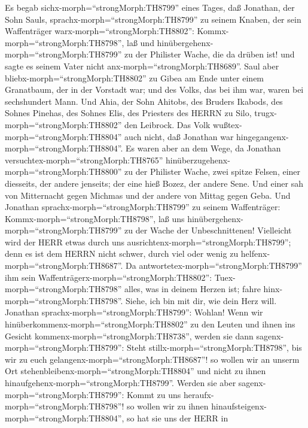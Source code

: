  Es begab sichx-morph=``strongMorph:TH8799'' eines Tages,
daß Jonathan, der Sohn Sauls, sprachx-morph=``strongMorph:TH8799'' zu
seinem Knaben, der sein Waffenträger warx-morph=``strongMorph:TH8802'':
Kommx-morph=``strongMorph:TH8798'', laß und
hinübergehenx-morph=``strongMorph:TH8799'' zu der Philister Wache, die
da drüben ist! und sagte es seinem Vater nicht
anx-morph=``strongMorph:TH8689''.  Saul aber
bliebx-morph=``strongMorph:TH8802'' zu Gibea am Ende unter einem
Granatbaum, der in der Vorstadt war; und des Volks, das bei ihm war,
waren bei sechshundert Mann.  Und Ahia, der Sohn Ahitobs,
des Bruders Ikabods, des Sohnes Pinehas, des Sohnes Elis, des Priesters
des HERRN zu Silo, trugx-morph=``strongMorph:TH8802'' den Leibrock. Das
Volk wußtex-morph=``strongMorph:TH8804'' auch nicht, daß Jonathan war
hingegangenx-morph=``strongMorph:TH8804''.  Es waren aber an
dem Wege, da Jonathan versuchtex-morph=``strongMorph:TH8765''
hinüberzugehenx-morph=``strongMorph:TH8800'' zu der Philister Wache,
zwei spitze Felsen, einer diesseits, der andere jenseits; der eine hieß
Bozez, der andere Sene.  Und einer sah von Mitternacht gegen
Michmas und der andere von Mittag gegen Geba.  Und Jonathan
sprachx-morph=``strongMorph:TH8799'' zu seinem Waffenträger:
Kommx-morph=``strongMorph:TH8798'', laß uns
hinübergehenx-morph=``strongMorph:TH8799'' zu der Wache der
Unbeschnittenen! Vielleicht wird der HERR etwas durch uns
ausrichtenx-morph=``strongMorph:TH8799''; denn es ist dem HERRN nicht
schwer, durch viel oder wenig zu helfenx-morph=``strongMorph:TH8687''.
 Da antwortetex-morph=``strongMorph:TH8799'' ihm sein
Waffenträgerx-morph=``strongMorph:TH8802'':
Tuex-morph=``strongMorph:TH8798'' alles, was in deinem Herzen ist; fahre
hinx-morph=``strongMorph:TH8798''. Siehe, ich bin mit dir, wie dein Herz
will.  Jonathan sprachx-morph=``strongMorph:TH8799'':
Wohlan! Wenn wir hinüberkommenx-morph=``strongMorph:TH8802'' zu den
Leuten und ihnen ins Gesicht kommenx-morph=``strongMorph:TH8738'',
 werden sie dann sagenx-morph=``strongMorph:TH8799'': Steht
stillx-morph=``strongMorph:TH8798'', bis wir zu euch
gelangenx-morph=``strongMorph:TH8687''! so wollen wir an unserm Ort
stehenbleibenx-morph=``strongMorph:TH8804'' und nicht zu ihnen
hinaufgehenx-morph=``strongMorph:TH8799''.  Werden sie aber
sagenx-morph=``strongMorph:TH8799'': Kommt zu uns
heraufx-morph=``strongMorph:TH8798''! so wollen wir zu ihnen
hinaufsteigenx-morph=``strongMorph:TH8804'', so hat sie uns der HERR in

